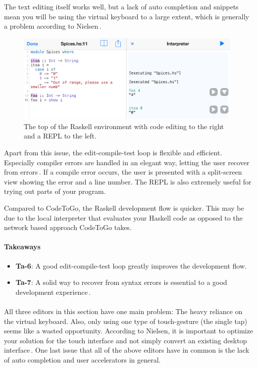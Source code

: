 The text editing itself works well, but a lack of auto completion and snippets mean you will be using the virtual keyboard to a large extent, which is generally a problem according to Nielsen\,\cite[pp. 76]{nielsen2013mobile}. 

\begin{figure}
	\centering
		\includegraphics[width=110mm]{diagrams/Raskell_screenshot.png}
	\caption{The top of the Raskell environment with code editing to the right and a REPL to the
	left.}
\label{fig:Raskell_screenshot}
\end{figure}

Apart from this issue, the edit-compile-test loop is flexible and efficient. Especially compiler errors are handled in an elegant way, letting the user recover from errors\,\cite{nielsen1990heuristic}. If a compile error occurs, the user is presented with a split-screen view showing the error and a line number. The REPL is also extremely useful for trying out parts of your program.

Compared to CodeToGo, the Raskell development flow is quicker. This may be due to the local interpreter that evaluates your Haskell code as opposed to the network based approach CodeToGo takes.

\paragraph{Takeaways}
\begin{itemize}
	\item \textbf{Ta-6}: A good edit-compile-test loop greatly improves the development flow.
	\item \textbf{Ta-7}: A solid way to recover from syntax errors is essential to a good development experience\,\cite{nielsen1990heuristic}.
\end{itemize}

\paragraph{}

All three editors in this section have one main problem: The heavy reliance on the virtual keyboard. Also, only using one type of touch-gesture (the single tap) seems like a wasted opportunity.
According to Nielsen, it is important to optimize your solution for the touch
interface and not simply convert an existing desktop interface\,\cite[p 26, p
41]{nielsen2013mobile}.
One last issue that all of the above editors have in common is the lack of auto completion and user accelerators in general.

